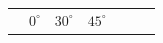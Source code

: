 {    %
    
        \begin{center}
      
      \label{m39408*id80733}
      
    \noindent
      \tablelasttail{}
      \begin{xtabular*}{\mytablewidth}[t]{|p{10\mystarwidth}|p{10\mystarwidth}|p{10\mystarwidth}|p{10\mystarwidth}|p{10\mystarwidth}|p{10\mystarwidth}|p{10\mystarwidth}|}\hline
    
    
         &
    
    
        
                \begin{math}{0}^{\circ }\end{math}
               &
    
    
        
                \begin{math}{30}^{\circ }\end{math}
               &
    
    
        
                \begin{math}{45}^{\circ }\end{math}
               &
    
    
        

\end{xtabular*}
\end{center}}

